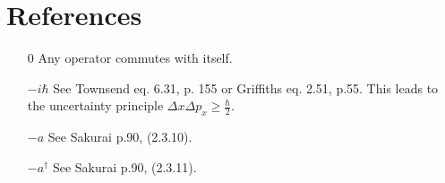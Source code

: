 \documentclass[12pt,letterpaper]{article}
\begin{document}
\section{References}
\begin{itemize}
\item[0] \label{self} Any operator commutes with itself.
\item[$-i \hbar$] \label{unc} See Townsend eq. 6.31, p. 155 or Griffiths eq. 2.51, p.55. This leads to the uncertainty principle $\Delta x \Delta p_x \geq \frac{\hbar}{2}$.
\item[$-a$] \label{N-a} See Sakurai p.90, (2.3.10).
\item[$-a^\dagger$] \label{N-aDag} See Sakurai p.90, (2.3.11).
\end{itemize}
\end{document}
